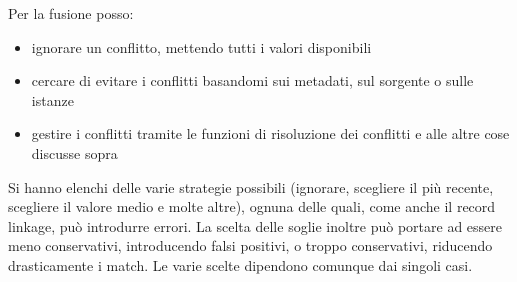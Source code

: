 Per la fusione posso:
\begin{itemize}
  \item ignorare un conflitto, mettendo tutti i valori disponibili
  \item cercare di evitare i conflitti basandomi sui metadati, sul sorgente o sulle istanze  
  \item gestire i conflitti tramite le funzioni di risoluzione dei conflitti e alle altre cose discusse sopra
\end{itemize}

Si hanno elenchi delle varie strategie possibili (ignorare, scegliere il più recente, scegliere il valore medio e molte altre), ognuna delle quali, come anche il record linkage, può introdurre errori. La scelta delle soglie inoltre può portare ad essere meno conservativi, introducendo falsi positivi, o troppo conservativi, riducendo drasticamente i match. Le varie scelte dipendono comunque dai singoli casi.